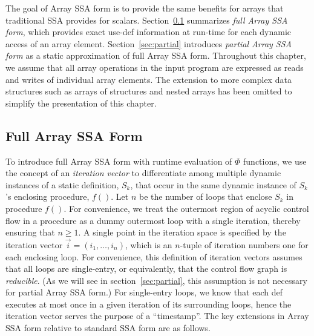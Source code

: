
The goal of Array SSA form is to provide the same benefits for arrays
that traditional SSA provides for scalars.
Section~\ref{sec:full} summarizes  {\it full Array SSA form}, which provides exact use-def information 
at run-time for each dynamic access of an array element.
Section~\ref{sec:partial} introduces {\it partial Array SSA form} as a
static approximation of full Array SSA form.
Throughout this chapter,
we assume that all array operations in the input program are
expressed as reads and writes of individual array elements.  The
extension to more complex data structures such as arrays of
structures and nested arrays 
has been
omitted to simplify the presentation of this chapter.

\subsection{Full Array SSA Form}\label{sec:full}


To introduce full Array SSA form with runtime evaluation of $\Phi$
functions,
we use the concept of an  {\it iteration vector} to differentiate among multiple dynamic
instances of a static definition, $S_k$, that occur in the same
dynamic instance of $S_k$'s enclosing procedure, $f()$.
Let $n$ be the number of loops that enclose $S_k$ in procedure $f()$.
For convenience, we treat the outermost
region of acyclic control flow in a procedure as a dummy outermost loop
with a single iteration, thereby ensuring that $n \geq 1$.
A single point in the
iteration space is specified by the iteration vector
$\vec{i} = (i_1, \ldots, i_n)$, which is
an 
$n$-tuple of iteration numbers
one for each enclosing loop. 
For convenience, this definition of iteration vectors assumes that  
all loops are single-entry, or equivalently, that the control flow
graph is {\it reducible}.
(As we will see in section~\ref{sec:partial}, this assumption is not necessary
for partial Array SSA form.)
For single-entry loops, we know that each def executes at most
once in a given iteration of its surrounding loops, hence the iteration vector
serves the purpose of a ``timestamp''.
The key extensions in Array SSA form relative to standard SSA form are as
follows.

